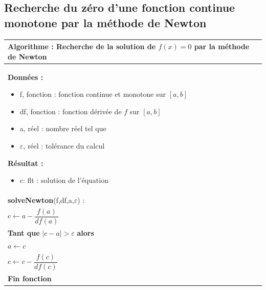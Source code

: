 \documentclass[10pt]{article}
\begin{document}
\subsection{Recherche du zéro d'une fonction continue monotone par la méthode de Newton}


\begin{minipage}[c]{.48\linewidth}
\begin{pseudo}
\begin{center}
\begin{tabular}{p{}}
\hline
\textbf{Algorithme :} Recherche de la solution de $f(x)=0$ par la méthode de Newton \\
\hline
\textbf{Données :}
\begin{itemize}
\item \textsf{f}, fonction : fonction continue et monotone sur $[a,b]$
\item \textsf{df}, fonction : fonction dérivée de $f$ sur $[a,b]$
\item \textsf{a}, réel : nombre réel tel que
\item \textsf{$\varepsilon$}, réel : tolérance du calcul
\end{itemize}
\textbf{Résultat :} 
\begin{itemize}
\item c: flt : solution de l'équation
\end{itemize}
\\
\textbf{solveNewton}(\textsf{f,df,a,$\varepsilon$}) :\\
\hspace{.4cm} $c \gets  a-\dfrac{f(a)}{df(a)} $\\ 
\hspace{.4cm} \textbf{Tant que} $ |c-a|> \varepsilon$ \textbf{alors} \\
\hspace{.8cm} $a \gets  c$\\
\hspace{.8cm} $c \gets  c-\dfrac{f(c)}{df(c)} $\\ 
\textbf{Fin fonction} \\
\hline
\end{tabular}
\end{center}
\end{pseudo}
\end{minipage} \hfill
\end{document}

